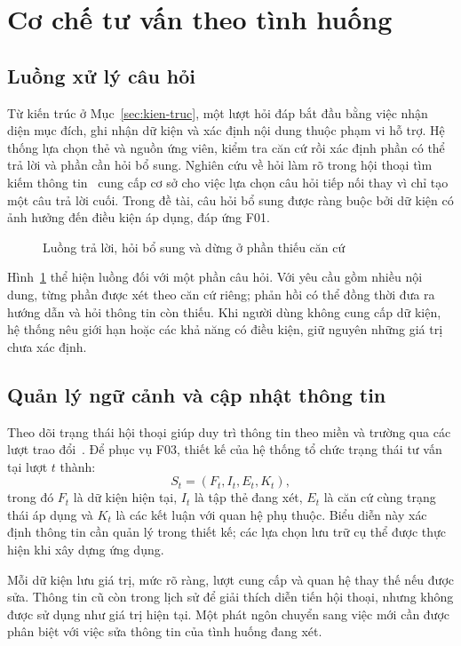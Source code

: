 \section{Cơ chế tư vấn theo tình huống}
\label{sec:co-che}
\subsection{Luồng xử lý câu hỏi}
Từ kiến trúc ở Mục~\ref{sec:kien-truc}, một lượt hỏi đáp bắt đầu bằng việc
nhận diện mục đích, ghi nhận dữ kiện và xác định nội dung thuộc phạm vi hỗ
trợ. Hệ thống lựa chọn thẻ và nguồn ứng viên, kiểm tra căn cứ rồi xác định
phần có thể trả lời và phần cần hỏi bổ sung. Nghiên cứu về hỏi làm rõ trong
hội thoại tìm kiếm thông tin~\cite{aliannejadi2019clarifying} cung cấp cơ sở
cho việc lựa chọn câu hỏi tiếp nối thay vì chỉ tạo một câu trả lời cuối.
Trong đề tài, câu hỏi bổ sung được ràng buộc bởi dữ kiện có ảnh hưởng đến
điều kiện áp dụng, đáp ứng F01.

\begin{figure}[H]
\centering
\caption{Luồng trả lời, hỏi bổ sung và dừng ở phần thiếu căn cứ}
\label{fig:luong}
\end{figure}

Hình~\ref{fig:luong} thể hiện luồng đối với một phần câu hỏi. Với yêu cầu gồm
nhiều nội dung, từng phần được xét theo căn cứ riêng; phản hồi có thể đồng
thời đưa ra hướng dẫn và hỏi thông tin còn thiếu. Khi người dùng không cung
cấp dữ kiện, hệ thống nêu giới hạn hoặc các khả năng có điều kiện, giữ nguyên
những giá trị chưa xác định.

\subsection{Quản lý ngữ cảnh và cập nhật thông tin}
Theo dõi trạng thái hội thoại giúp duy trì thông tin theo miền và trường
qua các lượt trao đổi~\cite{wu2019trade}. Để phục vụ F03, thiết kế của hệ
thống tổ chức trạng thái tư vấn tại lượt $t$ thành:
\begin{equation}
S_t=(F_t,I_t,E_t,K_t),
\label{eq:state}
\end{equation}
trong đó $F_t$ là dữ kiện hiện tại, $I_t$ là tập thẻ đang xét, $E_t$ là căn
cứ cùng trạng thái áp dụng và $K_t$ là các kết luận với quan hệ phụ thuộc.
Biểu diễn này xác định thông tin cần quản lý trong thiết kế; các lựa chọn
lưu trữ cụ thể được thực hiện khi xây dựng ứng dụng.

Mỗi dữ kiện lưu giá trị, mức rõ ràng, lượt cung cấp và quan hệ thay thế nếu
được sửa. Thông tin cũ còn trong lịch sử để giải thích diễn tiến hội thoại,
nhưng không được sử dụng như giá trị hiện tại. Một phát ngôn chuyển sang
việc mới cần được phân biệt với việc sửa thông tin của tình huống đang xét.

